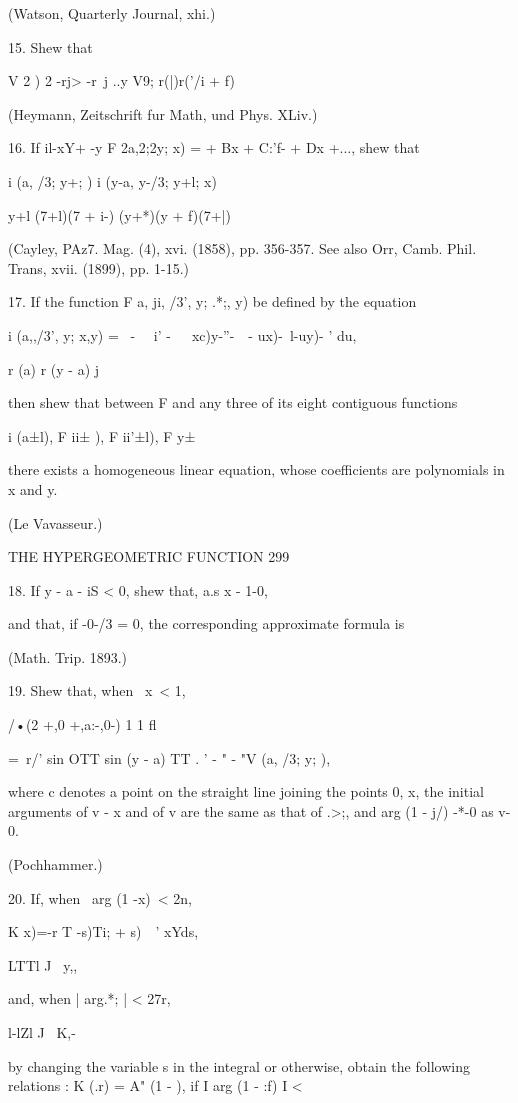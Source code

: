 (Watson, Quarterly Journal, xhi.)

15. Shew that

V 2 ) 2 -rj> -r\ j ..y V9; r(|)r('/i + f)

(Heymann, Zeitschrift fur Math, und Phys. XLiv.)

16. If il-xY+ -y F 2a,2;2y; x) = + Bx + C:'f- + Dx +..., shew that

i (a, /3; y+; ) i (y-a, y-/3; y+l; x)

y+l (7+l)(7 + i-) (y+*)(y + f)(7+|)

(Cayley, PAz7. Mag. (4), xvi. (1858), pp. 356-357. See also Orr, Camb.
Phil. Trans, xvii. (1899), pp. 1-15.)

17. If the function F a, ji, /3', y; .*;, y) be defined by the
equation

i (a,,/3', y; x,y) = \ - \ \ i' -\ \ ~xc)y-''-\ \ - ux)-\ l-uy)- '
du,

r (a) r (y - a) j

then shew that between F and any three of its eight contiguous
functions

i (a±l), F ii± ), F ii'±l), F y±\ \

there exists a homogeneous linear equation, whose coefficients are
polynomials in x and y.

(Le Vavasseur.)

THE HYPERGEOMETRIC FUNCTION 299

18. If y - a - iS < 0, shew that, a.s x - 1-0,

and that, if -0-/3 = 0, the corresponding approximate formula is

(Math. Trip. 1893.)

19. Shew that, when \ x\ < 1,

/•(2 +,0 +,a:-,0-) 1 1 fl

= \,r/' sin OTT sin (y - a) TT . ' - " - "V (a, /3; y; ),

where c denotes a point on the straight line joining the points 0, x,
the initial arguments of v - x and of v are the same as that of .>;,
and arg (1 - j/) -*-0 as v- 0.

(Pochhammer.)

20. If, when \ arg (1 -x)\ < 2n,

K x)=-r T -s)Ti; + s)\ \ ' xYds,

LTTl J \ y,,

and, when | arg.*; | < 27r,

l-lZl J \ K,-

by changing the variable s in the integral or otherwise, obtain the
following relations : K (.r) = A" (1 - ), if I arg (1 - :f) I <

